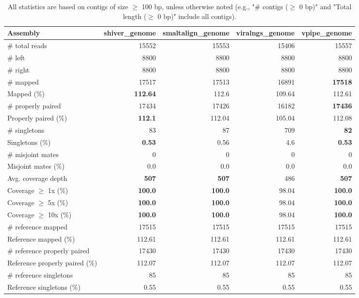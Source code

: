 \documentclass[12pt,a4paper]{article}
\begin{document}
\begin{table}[ht]
\begin{center}
\caption{All statistics are based on contigs of size $\geq$ 100 bp, unless otherwise noted (e.g., "\# contigs ($\geq$ 0 bp)" and "Total length ($\geq$ 0 bp)" include all contigs).}
\begin{tabular}{|l*{4}{|r}|}
\hline
Assembly & shiver\_genome & smaltalign\_genome & viralngs\_genome & vpipe\_genome \\ \hline
\# total reads & 15552 & 15553 & 15406 & 15557 \\ \hline
\# left & 8800 & 8800 & 8800 & 8800 \\ \hline
\# right & 8800 & 8800 & 8800 & 8800 \\ \hline
\# mapped & 17517 & 17513 & 16891 & {\bf 17518} \\ \hline
Mapped (\%) & {\bf 112.64} & 112.6 & 109.64 & 112.61 \\ \hline
\# properly paired & 17434 & 17426 & 16182 & {\bf 17436} \\ \hline
Properly paired (\%) & {\bf 112.1} & 112.04 & 105.04 & 112.08 \\ \hline
\# singletons & 83 & 87 & 709 & {\bf 82} \\ \hline
Singletons (\%) & {\bf 0.53} & 0.56 & 4.6 & {\bf 0.53} \\ \hline
\# misjoint mates & 0 & 0 & 0 & 0 \\ \hline
Misjoint mates (\%) & 0.0 & 0.0 & 0.0 & 0.0 \\ \hline
Avg. coverage depth & {\bf 507} & {\bf 507} & 486 & {\bf 507} \\ \hline
Coverage $\geq$ 1x (\%) & {\bf 100.0} & {\bf 100.0} & 98.04 & {\bf 100.0} \\ \hline
Coverage $\geq$ 5x (\%) & {\bf 100.0} & {\bf 100.0} & 98.04 & {\bf 100.0} \\ \hline
Coverage $\geq$ 10x (\%) & {\bf 100.0} & {\bf 100.0} & 98.04 & {\bf 100.0} \\ \hline
\# reference mapped & 17515 & 17515 & 17515 & 17515 \\ \hline
Reference mapped (\%) & 112.61 & 112.61 & 112.61 & 112.61 \\ \hline
\# reference properly paired & 17430 & 17430 & 17430 & 17430 \\ \hline
Reference properly paired (\%) & 112.07 & 112.07 & 112.07 & 112.07 \\ \hline
\# reference singletons & 85 & 85 & 85 & 85 \\ \hline
Reference singletons (\%) & 0.55 & 0.55 & 0.55 & 0.55 \\ \hline

\end{tabular}
\end{center}
\end{table}
\end{document}

